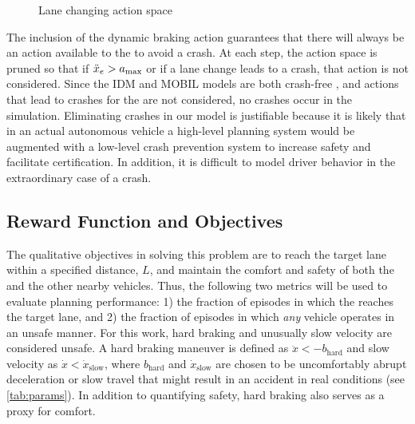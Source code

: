 \begin{figure}[tb]
    \centering
    
    
    \caption{Lane changing action space}
    \label{fig:actions}
\end{figure}


The inclusion of the dynamic braking action guarantees that there will always be an action available to the \av{} to avoid a crash.
At each step, the action space is pruned so that if ${\ddot{x}}_e > a_\text{max}$ or if a lane change leads to a crash, that action is not considered.
Since the IDM and MOBIL models are both crash-free \cite{kesting2009agents}, and actions that lead to crashes for the \av{} are not considered, no crashes occur in the simulation.
Eliminating crashes in our model is justifiable because it is likely that in an actual autonomous vehicle a high-level planning system would be augmented with a low-level crash prevention system to increase safety and facilitate certification. 
In addition, it is difficult to model driver behavior in the extraordinary case of a crash. 

\subsection{Reward Function and Objectives} \label{sec:reward}

The qualitative objectives in solving this problem are to reach the target lane within a specified distance, $L$, and maintain the comfort and safety of both the \av{} and the other nearby vehicles.
Thus, the following two metrics will be used to evaluate planning performance: 1) the fraction of episodes in which the \av{} reaches the target lane, and 2) the fraction of episodes in which \emph{any} vehicle operates in an unsafe manner.
For this work, hard braking and unusually slow velocity are considered unsafe.
A hard braking maneuver is defined as $\ddot{x} < -b_\text{hard}$ and slow velocity as $\dot{x} < \dot{x}_\text{slow}$, where $b_\text{hard}$ and $\dot{x}_\text{slow}$ are chosen to be uncomfortably abrupt deceleration or slow travel that might result in an accident in real conditions (see \cref{tab:params}).
In addition to quantifying safety, hard braking also serves as a proxy for comfort.

